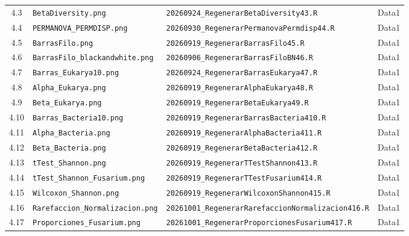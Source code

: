 \begin{table}[H]
\begin{tabular}{cp{4.3cm}p{4.9cm}p{1.5cm}}
4.3 & \texttt{BetaDiversity.png} & \texttt{20260924\_Regenerar}\newline\texttt{BetaDiversity43.R} & Data1 \\
4.4 & \texttt{PERMANOVA\_PERMDISP.png} & \texttt{20260930\_Regenerar}\newline\texttt{PermanovaPermdisp44.R} & Data1 \\
4.5 & \texttt{BarrasFilo.png} & \texttt{20260919\_Regenerar}\newline\texttt{BarrasFilo45.R} & Data1 \\
4.6 & \texttt{BarrasFilo\_}\newline\texttt{blackandwhite.png} & \texttt{20260906\_Regenerar}\newline\texttt{BarrasFiloBN46.R} & Data1 \\
4.7 & \texttt{Barras\_Eukarya10.png} & \texttt{20260924\_Regenerar}\newline\texttt{BarrasEukarya47.R} & Data1 \\
4.8 & \texttt{Alpha\_Eukarya.png} & \texttt{20260919\_Regenerar}\newline\texttt{AlphaEukarya48.R} & Data1 \\
4.9 & \texttt{Beta\_Eukarya.png} & \texttt{20260919\_Regenerar}\newline\texttt{BetaEukarya49.R} & Data1 \\
4.10 & \texttt{Barras\_Bacteria10.png} & \texttt{20260919\_Regenerar}\newline\texttt{BarrasBacteria410.R} & Data1 \\
4.11 & \texttt{Alpha\_Bacteria.png} & \texttt{20260919\_Regenerar}\newline\texttt{AlphaBacteria411.R} & Data1 \\
4.12 & \texttt{Beta\_Bacteria.png} & \texttt{20260919\_Regenerar}\newline\texttt{BetaBacteria412.R} & Data1 \\
4.13 & \texttt{tTest\_Shannon.png} & \texttt{20260919\_Regenerar}\newline\texttt{TTestShannon413.R} & Data1 \\
4.14 & \texttt{tTest\_Shannon\_Fusarium.png} & \texttt{20260919\_Regenerar}\newline\texttt{TTestFusarium414.R} & Data1 \\
4.15 & \texttt{Wilcoxon\_Shannon.png} & \texttt{20260919\_Regenerar}\newline\texttt{WilcoxonShannon415.R} & Data1 \\
4.16 & \texttt{Rarefaccion\_}\newline\texttt{Normalizacion.png} & \texttt{20261001\_Regenerar}\newline\texttt{RarefaccionNormalizacion416.R} & Data1 \\
4.17 & \texttt{Proporciones\_Fusarium.png} & \texttt{20261001\_Regenerar}\newline\texttt{ProporcionesFusarium417.R} & Data1 \\
\hline
\end{tabular}
\end{table}

